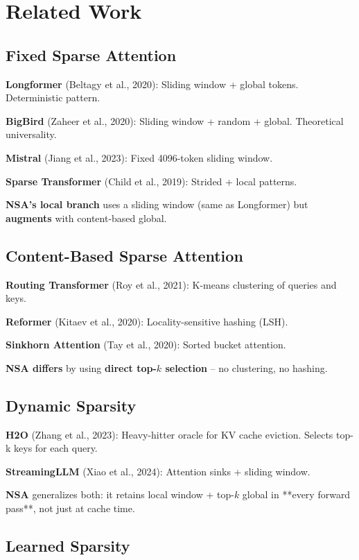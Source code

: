 
\section{Related Work}

\subsection{Fixed Sparse Attention}

\textbf{Longformer} (Beltagy et al., 2020): Sliding window + global tokens. 
Deterministic pattern.

\textbf{BigBird} (Zaheer et al., 2020): Sliding window + random + global. 
Theoretical universality.

\textbf{Mistral} (Jiang et al., 2023): Fixed 4096-token sliding window.

\textbf{Sparse Transformer} (Child et al., 2019): Strided + local patterns.

\textbf{NSA's local branch} uses a sliding window (same as Longformer) but 
\textbf{augments} with content-based global.

\subsection{Content-Based Sparse Attention}

\textbf{Routing Transformer} (Roy et al., 2021): K-means clustering of queries 
and keys.

\textbf{Reformer} (Kitaev et al., 2020): Locality-sensitive hashing (LSH).

\textbf{Sinkhorn Attention} (Tay et al., 2020): Sorted bucket attention.

\textbf{NSA differs} by using \textbf{direct top-$k$ selection} -- no clustering, no 
hashing.

\subsection{Dynamic Sparsity}

\textbf{H2O} (Zhang et al., 2023): Heavy-hitter oracle for KV cache eviction. 
Selects top-k keys for each query.

\textbf{StreamingLLM} (Xiao et al., 2024): Attention sinks + sliding window.

\textbf{NSA} generalizes both: it retains local window + top-$k$ global in **every 
forward pass**, not just at cache time.

\subsection{Learned Sparsity}


